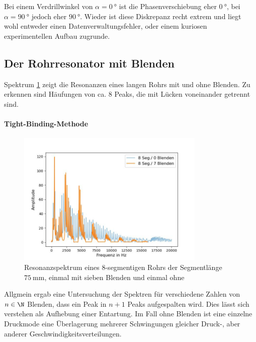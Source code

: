 \documentclass[../main.tex]{subfiles}
\begin{document}
        Bei einem Verdrillwinkel von $\alpha=\SI{0}{\degree}$ ist die Phasenverschiebung eher $\SI{0}{\degree}$, bei $\alpha=\SI{90}{\degree}$ jedoch eher $\SI{90}{\degree}$. Wieder ist diese Diskrepanz recht extrem und liegt wohl entweder einen Datenverwaltungsfehler, oder einem kuriosen experimentellen Aufbau zugrunde.

\subsection{Der Rohrresonator mit Blenden}
    Spektrum \ref{fig:V_i_Resonanzspektrum_Lang} zeigt die Resonanzen eines langen Rohrs mit und ohne Blenden. Zu erkennen sind Häufungen von ca. 8 Peaks, die mit Lücken voneinander getrennt sind.

    \paragraph{Tight-Binding-Methode}
        \begin{figure}[H]
            \centering
            \includegraphics[width=0.8\textwidth]{Bilddateien/Auswertung/V_i_Resonanzspektrum_Lang.jpg}
            \caption{Resonanzspektrum eines 8-segmentigen Rohrs der Segmentlänge $\SI{75}{\milli\metre}$, einmal mit sieben Blenden und einmal ohne}
            \label{fig:V_i_Resonanzspektrum_Lang}
        \end{figure}

        Allgmein ergab eine Untersuchung der Spektren für verschiedene Zahlen von $n\in\N$ Blenden, dass ein Peak in $n + 1$ Peaks aufgespalten wird. Dies lässt sich verstehen als Aufhebung einer Entartung. Im Fall ohne Blenden ist eine einzelne Druckmode eine Überlagerung mehrerer Schwingungen gleicher Druck-, aber anderer Geschwindigkeitsverteilungen.
\end{document}
